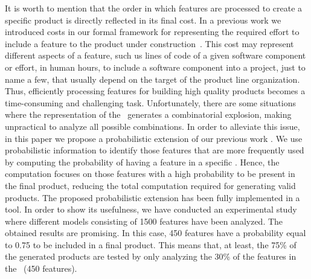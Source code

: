 It is worth to mention that the order in which features are processed to create a specific product is directly reflected in its final cost. In a previous work we introduced costs in our formal framework for representing the required effort to include a feature to the product under construction~\cite{cln16}. This cost may represent different aspects of a feature, such us lines of code of a given software component or effort, in human hours, to include a software component into a project, just to name a few, that usually depend on the target of the product line organization. Thus, efficiently processing features for building high quality products becomes a time-consuming and challenging task. Unfortunately, there are some situations where the representation of the \SPL\ generates a combinatorial explosion, making unpractical to analyze all possible combinations.
%
In order to alleviate this issue, in this paper we propose a probabilistic extension of our previous work \fodaPA. We use probabilistic information to identify those features that are more frequently used by computing the probability of having a feature in a specific \SPL. Hence, the computation focuses on those features with a high probability to be present in the final product, reducing the total computation required for generating valid products. The proposed probabilistic extension has been fully implemented in a tool. In order to show its usefulness, we have conducted an experimental study where different models consisting of 1500 features have been analyzed. The obtained results are promising. In this case, 450 features have a probability equal to 0.75 to be included in a final product. This means that, at least, the 75\% of the generated products are tested by only analyzing the 30\% of the features in the \SPL\ (450 features).

